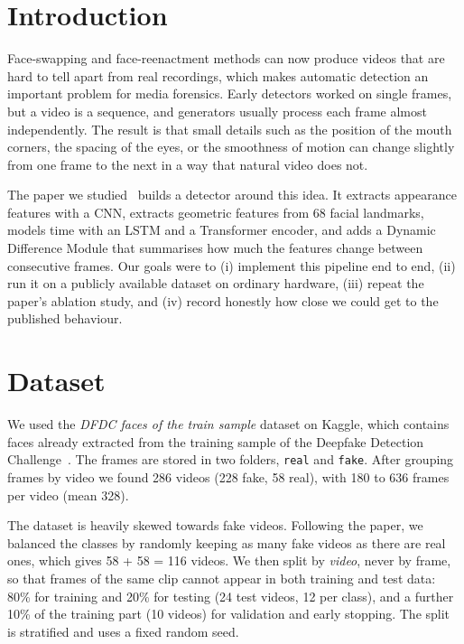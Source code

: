 \documentclass[11pt,a4paper]{article}
\begin{document}
\section{Introduction}
Face-swapping and face-reenactment methods can now produce videos that are hard to tell apart from real recordings, which makes automatic detection an important problem for media forensics. Early detectors worked on single frames, but a video is a sequence, and generators usually process each frame almost independently. The result is that small details such as the position of the mouth corners, the spacing of the eyes, or the smoothness of motion can change slightly from one frame to the next in a way that natural video does not.

The paper we studied~\cite{abdelfattah2026} builds a detector around this idea. It extracts appearance features with a CNN, extracts geometric features from 68 facial landmarks, models time with an LSTM and a Transformer encoder, and adds a Dynamic Difference Module that summarises how much the features change between consecutive frames. Our goals were to (i) implement this pipeline end to end, (ii) run it on a publicly available dataset on ordinary hardware, (iii) repeat the paper's ablation study, and (iv) record honestly how close we could get to the published behaviour.

\section{Dataset}
We used the \emph{DFDC faces of the train sample} dataset on Kaggle, which contains faces already extracted from the training sample of the Deepfake Detection Challenge~\cite{dfdc}. The frames are stored in two folders, \texttt{real} and \texttt{fake}. After grouping frames by video we found 286 videos (228 fake, 58 real), with 180 to 636 frames per video (mean 328).

The dataset is heavily skewed towards fake videos. Following the paper, we balanced the classes by randomly keeping as many fake videos as there are real ones, which gives 58 + 58 = 116 videos. We then split by \emph{video}, never by frame, so that frames of the same clip cannot appear in both training and test data: 80\% for training and 20\% for testing (24 test videos, 12 per class), and a further 10\% of the training part (10 videos) for validation and early stopping. The split is stratified and uses a fixed random seed.
\end{document}
